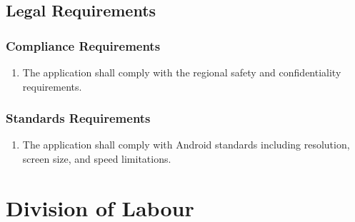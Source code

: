 \documentclass[titlepage]{article}
\newcounter{myCounter}
\begin{document}

\subsection{Legal Requirements}
\label{sub:legal_requirements}
\setcounter{myCounter}{0}

\subsubsection{Compliance Requirements}
\label{ssub:compliance_requirements}
\begin{enumerate}[{LR}1. ]
    \setcounter{enumi}{\themyCounter}
	\item The application shall comply with the regional safety and confidentiality requirements.
    \setcounter{myCounter}{\theenumi}
\end{enumerate}

\subsubsection{Standards Requirements}
\label{ssub:standards_requirements}
\begin{enumerate}[{LR}1. ]
    \setcounter{enumi}{\themyCounter}
    \item The application shall comply with Android standards including resolution, screen size, and
speed limitations.
    \setcounter{myCounter}{\theenumi}
\end{enumerate}



\newpage
\appendix
\section{Division of Labour}%
\label{sec:division_of_labour}
\end{document}
